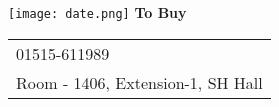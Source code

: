 \documentclass{article}
\begin{document}
\vspace*{\fill}
\begin{center}
  \texttt{[image: date.png]}
  {\Huge\textbf{To Buy}}
  \\
  \LARGE
\vspace{2cm}
  \begin{tabular}{l}
 \faPhone{} 01515-611989\\
  \faHome{} Room - 1406, Extension-1, SH Hall
  \end{tabular}
\end{center}
\vspace*{\fill}
 
\end{document}
